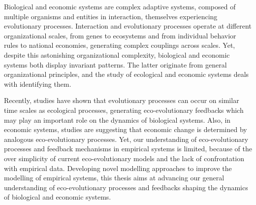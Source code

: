 %
\label{sec:summary}
\small{
Biological and economic systems are complex adaptive systems, composed of multiple organisms and entities in interaction, themselves experiencing evolutionary processes.
% 
Interaction and evolutionary processes operate at different organizational scales, from genes to ecosystems and from individual behavior rules to national economies, generating complex couplings across scales. Yet, despite this astonishing organizational complexity, biological and economic systems both display invariant patterns. 
% 
%
The latter originate from general organizational principles, and the study of ecological and economic systems deals with identifying them.

Recently, studies have shown that evolutionary processes can occur on similar time scales as ecological processes, generating eco-evolutionary feedbacks which may play an important role on the dynamics of biological systems. %
% 
Also, in economic systems, studies are suggesting that economic change is determined by analogous eco-evolutionary processes. 
Yet, our understanding of eco-evolutionary processes and feedback mechanisms in empirical systems is limited, because of the over simplicity of current eco-evolutionary models and the lack of confrontation with empirical data. %
% 
% 
% 
Developing novel modelling approaches to improve the modelling of empirical systems, this thesis aims at advancing our general understanding of eco-evolutionary processes and feedbacks shaping the dynamics of biological and economic systems.

}
